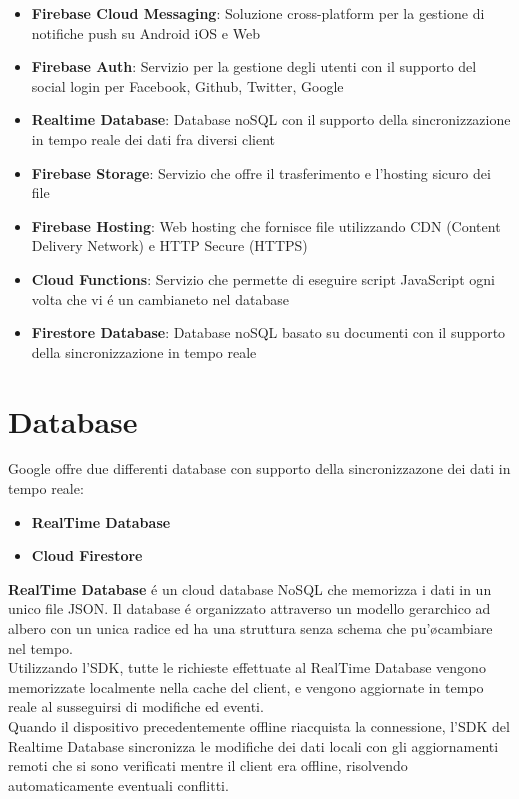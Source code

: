 \begin{itemize}                         %
\item \textbf{Firebase Cloud Messaging}: Soluzione cross-platform per la gestione di notifiche push su Android iOS e Web

\item \textbf{Firebase Auth}: Servizio per la gestione degli utenti con il supporto del social login per Facebook, Github, Twitter, Google

\item \textbf{Realtime Database}: Database noSQL con il supporto della sincronizzazione in tempo reale dei dati fra diversi client

\item \textbf{Firebase Storage}: Servizio che offre il trasferimento e l'hosting sicuro dei file

\item \textbf{Firebase Hosting}: Web hosting che fornisce file utilizzando CDN (Content Delivery Network) e HTTP Secure (HTTPS)

\item \textbf{Cloud Functions}: Servizio che permette di eseguire script JavaScript  ogni volta che vi \'e un cambianeto nel database

\item \textbf{Firestore Database}: Database noSQL basato su documenti con il supporto della sincronizzazione in tempo reale
\end{itemize}




\section{Database}                 %
Google offre due differenti database con supporto della sincronizzazone dei dati in tempo reale:

\begin{itemize}
  \item \textbf{RealTime Database}
  \item \textbf{Cloud Firestore}
\end{itemize}


\textbf{RealTime Database} \'e un cloud database NoSQL che memorizza i dati in un unico file JSON. Il database \'e organizzato attraverso un modello gerarchico ad albero con un unica radice ed ha una struttura senza schema che pu'\o cambiare nel tempo.\\
Utilizzando l'SDK, tutte le richieste effettuate al RealTime Database vengono memorizzate localmente nella cache del client, e vengono aggiornate in tempo reale al susseguirsi di modifiche ed eventi.\\ Quando il dispositivo precedentemente offline riacquista la connessione, l'SDK del Realtime Database sincronizza le modifiche dei dati locali con gli aggiornamenti remoti che si sono verificati mentre il client era offline, risolvendo automaticamente eventuali conflitti.\\


